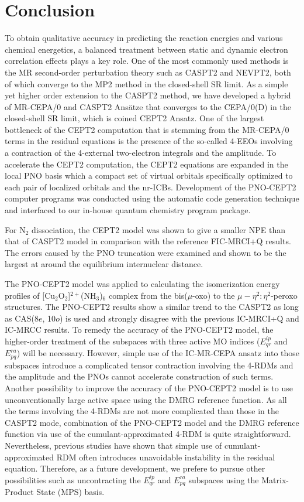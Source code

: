 \documentclass[aip,jcp,amsmath]{revtex4-1}
\begin{document}
\section{Conclusion}\label{Sec:Conclusion}

%
To obtain qualitative accuracy in predicting the reaction energies and various chemical energetics, a balanced treatment between static and dynamic electron correlation effects plays a key role.
%
One of the most commonly used methods is the MR second-order perturbation theory such as CASPT2 and NEVPT2, both of which converge to the MP2 method in the closed-shell SR limit.
%
As a simple yet higher order extension to the CASPT2 method, we have developed a hybrid of MR-CEPA/0 and CASPT2 Ans\"atze that converges to the CEPA/0(D) in the closed-shell SR limit, which is coined CEPT2 Ansatz.
%
One of the largest bottleneck of the CEPT2 computation that is stemming from the MR-CEPA/0 terms in the residual equations is the presence of the so-called 4-EEOs involving a contraction of the 4-external two-electron integrals and the amplitude.
%
To accelerate the CEPT2 computation, the CEPT2 equations are expanded in the local PNO basis which a compact set of virtual orbitals specifically optimized to each pair of localized orbitals and the nr-ICBs.
%
Development of the PNO-CEPT2 computer programs was conducted using the automatic code generation technique and interfaced to our in-house quantum chemistry program package.

%
For N${}_2$ dissociation, the CEPT2 model was shown to give a smaller NPE than that of CASPT2 model in comparison with the reference FIC-MRCI+Q results.
%
The errors caused by the PNO truncation were examined and shown to be the largest at around the equilibrium internuclear distance.

%
The PNO-CEPT2 model was applied to calculating the isomerization energy profiles of [Cu${}_2$O${}_2$]${}^{2+}$(NH${}_3$)${}_{6}$ complex from the bis($\mu$-oxo) to the $\mu-\eta^2:\eta^2$-peroxo structures.
%
The PNO-CEPT2 results show a similar trend to the CASPT2 as long as CAS(8$e$, 10$o$) is used and strongly disagree with the previous IC-MRCI+Q and IC-MRCC results.
%
To remedy the accuracy of the PNO-CEPT2 model, the higher-order treatment of the subspaces with three active MO indices ($E^{ip}_{qr}$ and $E^{ra}_{pq}$) will be necessary.
%
However, simple use of the IC-MR-CEPA ansatz into those subspaces introduce a complicated tensor contraction involving the 4-RDMs and the amplitude and the PNOs cannot accelerate construction of such terms.
%
Another possibility to improve the accuracy of the PNO-CEPT2 model is to use unconventionally large active space using the DMRG reference function.
%
As all the terms involving the 4-RDMs are not more complicated than those in the CASPT2 mode, combination of the PNO-CEPT2 model and the DMRG reference function via use of the cumulant-approximated 4-RDM is quite straightforward.
%
Nevertheless, previous studies have shown that simple use of cumulant-approximated RDM often introduces unavoidable instability in the residual equation.
%
Therefore, as a future development, we prefere to pursue other possibilities such as uncontracting the $E^{ip}_{qr}$ and $E^{ra}_{pq}$ subspaces using the Matrix-Product State (MPS) basis.
\end{document}
